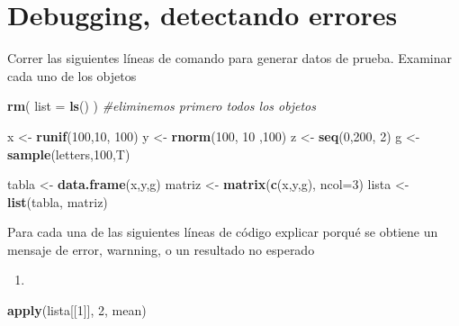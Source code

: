 \documentclass[]{book}
\newenvironment{Shaded}{\begin{snugshade}}{\end{snugshade}}
\newcommand{\CommentTok}[1]{\textcolor[rgb]{0.56,0.35,0.01}{\textit{#1}}}
\newcommand{\DataTypeTok}[1]{\textcolor[rgb]{0.13,0.29,0.53}{#1}}
\newcommand{\DecValTok}[1]{\textcolor[rgb]{0.00,0.00,0.81}{#1}}
\newcommand{\KeywordTok}[1]{\textcolor[rgb]{0.13,0.29,0.53}{\textbf{#1}}}
\newcommand{\NormalTok}[1]{#1}
\newcommand{\StringTok}[1]{\textcolor[rgb]{0.31,0.60,0.02}{#1}}
\begin{document}
\hypertarget{debugging-detectando-errores-6}{%
\section{Debugging, detectando errores}\label{debugging-detectando-errores-6}}

Correr las siguientes líneas de comando para generar datos de prueba. Examinar cada uno de los objetos

\begin{Shaded}
\begin{Highlighting}[]
\KeywordTok{rm}\NormalTok{( }\DataTypeTok{list =} \KeywordTok{ls}\NormalTok{() ) }\CommentTok{#eliminemos primero todos los objetos}
\end{Highlighting}
\end{Shaded}

\begin{Shaded}
\begin{Highlighting}[]
\NormalTok{x <-}\StringTok{ }\KeywordTok{runif}\NormalTok{(}\DecValTok{100}\NormalTok{,}\DecValTok{10}\NormalTok{, }\DecValTok{100}\NormalTok{)}
\NormalTok{y <-}\StringTok{ }\KeywordTok{rnorm}\NormalTok{(}\DecValTok{100}\NormalTok{, }\DecValTok{10}\NormalTok{ ,}\DecValTok{100}\NormalTok{)}
\NormalTok{z <-}\StringTok{ }\KeywordTok{seq}\NormalTok{(}\DecValTok{0}\NormalTok{,}\DecValTok{200}\NormalTok{, }\DecValTok{2}\NormalTok{)}
\NormalTok{g  <-}\StringTok{ }\KeywordTok{sample}\NormalTok{(letters,}\DecValTok{100}\NormalTok{,T)}

\NormalTok{tabla <-}\StringTok{ }\KeywordTok{data.frame}\NormalTok{(x,y,g)}
\NormalTok{matriz <-}\StringTok{ }\KeywordTok{matrix}\NormalTok{(}\KeywordTok{c}\NormalTok{(x,y,g), }\DataTypeTok{ncol=}\DecValTok{3}\NormalTok{)}
\NormalTok{lista <-}\StringTok{ }\KeywordTok{list}\NormalTok{(tabla, matriz)}
\end{Highlighting}
\end{Shaded}

Para cada una de las siguientes líneas de código explicar porqué se obtiene un mensaje de error, warnning, o un resultado no esperado

\begin{enumerate}
\def\labelenumi{\arabic{enumi}.}
\item
\end{enumerate}

\begin{Shaded}
\begin{Highlighting}[]
\KeywordTok{apply}\NormalTok{(lista[[}\DecValTok{1}\NormalTok{]], }\DecValTok{2}\NormalTok{, mean)}
\end{Highlighting}
\end{Shaded}
\end{document}
